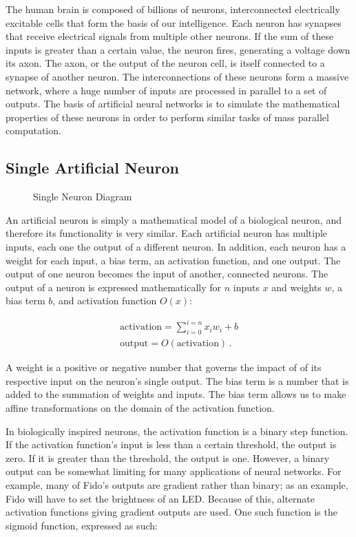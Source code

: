 The human brain is composed of billions of neurons, interconnected electrically excitable cells that form the basis of our intelligence. Each neuron has synapses that receive electrical signals from multiple other neurons. If the sum of these inputs is greater than a certain value, the neuron fires, generating a voltage down its axon. The axon, or the output of the neuron cell, is itself connected to a synapse of another neuron. The interconnections of these neurons form a massive network, where a huge number of inputs are processed in parallel to a set of outputs. The basis of artificial neural networks is to simulate the mathematical properties of these neurons in order to perform similar tasks of mass parallel computation.


\subsection{Single Artificial Neuron}


\begin{figure}[ht]
	\centering
	
	\caption{Single Neuron Diagram}
\end{figure}

An artificial neuron is simply a mathematical model of a biological neuron, and therefore its functionality is very similar. Each artificial neuron has multiple inputs, each one the output of a different neuron. In addition, each neuron has a weight for each input, a bias term, an activation function, and one output. The output of one neuron becomes the input of another, connected neurons. The output of a neuron is expressed mathematically for $n$ inputs $x$ and weights $w$, a bias term $b$, and activation function $O(x)$:

\begin{align*}
	\text{activation} = \sum_{i=0}^{i=n}x_i w_i + b\\
	\text{output} = O(\text{activation})
	\,.
\end{align*}

A weight is a positive or negative number that governs the impact of of its respective input on the neuron's single output. The bias term is a number that is added to the summation of weights and inputs. The bias term allows us to make affine transformations on the domain of the activation function. 

In biologically inspired neurons, the activation function is a binary step function. If the activation function's input is less than a certain threshold, the output is zero. If it is greater than the threshold, the output is one. However, a binary output can be somewhat limiting for many applications of neural networks. For example, many of Fido's outputs are gradient rather than binary; as an example, Fido will have to set the brightness of an LED. Because of this, alternate activation functions giving gradient outputs are used. One such function is the sigmoid function, expressed as such:

